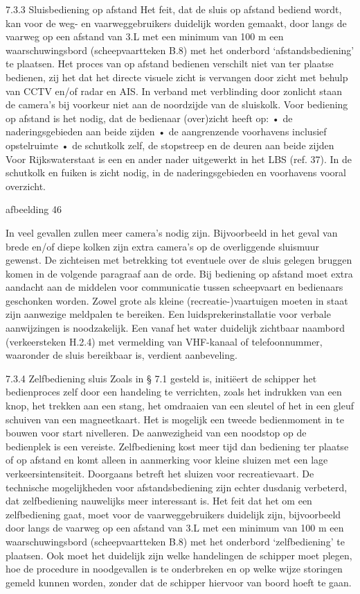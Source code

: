 7.3.3 Sluisbediening op afstand
Het feit, dat de sluis op afstand bediend wordt, kan voor de weg- en vaarweggebruikers
duidelijk worden gemaakt, door langs de vaarweg op een afstand van 3.L met een minimum
van 100 m een waarschuwingsbord (scheepvaartteken B.8) met het onderbord ‘afstandsbediening’ te plaatsen.
Het proces van op afstand bedienen verschilt niet van ter plaatse bedienen, zij het dat het
directe visuele zicht is vervangen door zicht met behulp van CCTV en/of radar en AIS.
In verband met verblinding door zonlicht staan de camera’s bij voorkeur niet aan de noordzijde
van de sluiskolk. Voor bediening op afstand is het nodig, dat de bedienaar (over)zicht heeft op:
• de naderingsgebieden aan beide zijden
• de aangrenzende voorhavens inclusief opstelruimte
• de schutkolk zelf, de stopstreep en de deuren aan beide zijden
Voor Rijkswaterstaat is een en ander nader uitgewerkt in het LBS (ref. 37).
In de schutkolk en fuiken is zicht nodig, in de naderingsgebieden en voorhavens vooral
overzicht.



afbeelding 46


In veel gevallen zullen meer camera’s nodig zijn. Bijvoorbeeld in het geval van brede en/of diepe
kolken zijn extra camera’s op de overliggende sluismuur gewenst. De zichteisen met betrekking
tot eventuele over de sluis gelegen bruggen komen in de volgende paragraaf aan de orde.
Bij bediening op afstand moet extra aandacht aan de middelen voor communicatie tussen
scheepvaart en bedienaars geschonken worden. Zowel grote als kleine (recreatie-)vaartuigen
moeten in staat zijn aanwezige meldpalen te bereiken. Een luidsprekerinstallatie voor verbale
aanwijzingen is noodzakelijk. Een vanaf het water duidelijk zichtbaar naambord (verkeersteken
H.2.4) met vermelding van VHF-kanaal of telefoonnummer, waaronder de sluis bereikbaar is,
verdient aanbeveling.

7.3.4 Zelfbediening sluis
Zoals in § 7.1 gesteld is, initiëert de schipper het bedienproces zelf door een handeling te
verrichten, zoals het indrukken van een knop, het trekken aan een stang, het omdraaien van
een sleutel of het in een gleuf schuiven van een magneetkaart. Het is mogelijk een tweede
bedienmoment in te bouwen voor start nivelleren. De aanwezigheid van een noodstop op de
bedienplek is een vereiste. Zelfbediening kost meer tijd dan bediening ter plaatse of op afstand
en komt alleen in aanmerking voor kleine sluizen met een lage verkeersintensiteit. Doorgaans
betreft het sluizen voor recreatievaart. De technische mogelijkheden voor afstandsbediening
zijn echter dusdanig verbeterd, dat zelfbediening nauwelijks meer interessant is.
Het feit dat het om een zelfbediening gaat, moet voor de vaarweggebruikers duidelijk zijn,
bijvoorbeeld door langs de vaarweg op een afstand van 3.L met een minimum van 100 m een
waarschuwingsbord (scheepvaartteken B.8) met het onderbord ‘zelfbediening’ te plaatsen.
Ook moet het duidelijk zijn welke handelingen de schipper moet plegen, hoe de procedure in
noodgevallen is te onderbreken en op welke wijze storingen gemeld kunnen worden, zonder
dat de schipper hiervoor van boord hoeft te gaan.



